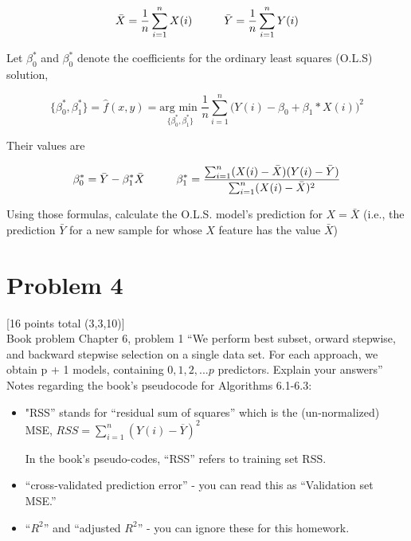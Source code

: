 \documentclass[12pt]{article}
\newcommand\tab[1][1cm]{\hspace*{#1}}
\begin{document}
\begin{center}
    \[
        \bar{X} = \frac{1}{n}\sum_{i = 1}^{n}X(i)
        \tab
        \bar{Y} = \frac{1}{n}\sum_{i = 1}^{n}Y(i)
    \]
\end{center}

Let $\beta_{0}^{*}$ and $\beta_{0}^{*}$ denote the coefficients for the ordinary least squares (O.L.S) solution,

\begin{center}
    \[
        \{\beta_{0}^{*}, \beta_{1}^{*}\} = \hat{f}(x,y) = \underset{\{\beta_{0}^{*}, \beta_{1}^{*}\}}{\text{arg min }}\frac{1}{n}\sum_{i = 1}^{n} \bigg( Y(i) - \beta_0 + \beta_1*X(i) \bigg) ^2
    \]
\end{center}

Their values are

\begin{center}
    \[
        \beta_{0}^{*} = \bar{Y} - \beta_{1}^{*}\bar{X}
        \tab
        \beta_{1}^{*} = \frac{\sum_{i = 1}^{n}(X(i) - \bar{X})(Y(i)-\bar{Y})}{\sum_{i = 1}^{n}(X(i)-\bar{X})^2}
    \]
\end{center}

Using those formulas, calculate the O.L.S. model's prediction for $ X = \bar{X}$ (i.e., the prediction $\bar{Y}$ for a new sample for whose $X$ feature has the value $\bar{X}$)

\pagebreak
\section*{Problem 4}
 [16 points total (3,3,10)]\\
Book problem Chapter 6, problem 1 “We perform best subset, orward stepwise, and backward stepwise selection on a single data set. For each approach, we obtain p + 1 models, containing $0, 1, 2, ... p$ predictors.  Explain your answers” \newline
Notes regarding the book's pseudocode for Algorithms 6.1-6.3:

\begin{itemize}
    \item "RSS” stands for “residual sum of squares” which is the (un-normalized) MSE,\newline
          $RSS = \sum_{i = 1}^{n} ( Y(i) - \overline{Y} )^{2}$

          \medspace

          In the book's pseudo-codes, “RSS” refers to training set RSS.

    \item “cross-validated prediction error” - you can read this as “Validation set MSE.”
    \item “$R^2$” and “adjusted $R^2$” - you can ignore these for this homework.
\end{itemize}
\end{document}
